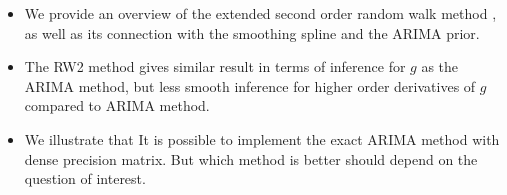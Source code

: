 \documentclass{beamer} %
\begin{document}
\begin{frame}
\begin{itemize}

\item We provide an overview of the extended second order random walk method \citep{rw2}, as well as its connection with the smoothing spline \citep{wahba} and the ARIMA prior.

\pause

\item The RW2 method gives similar result in terms of inference for $g$ as the ARIMA method, but less smooth inference for higher order derivatives of $g$ compared to ARIMA method.

\pause


\pause

\item We illustrate that It is possible to implement the exact ARIMA method with dense precision matrix. But which method is better should depend on the question of interest.

\end{itemize}
\end{frame}











\end{document}
